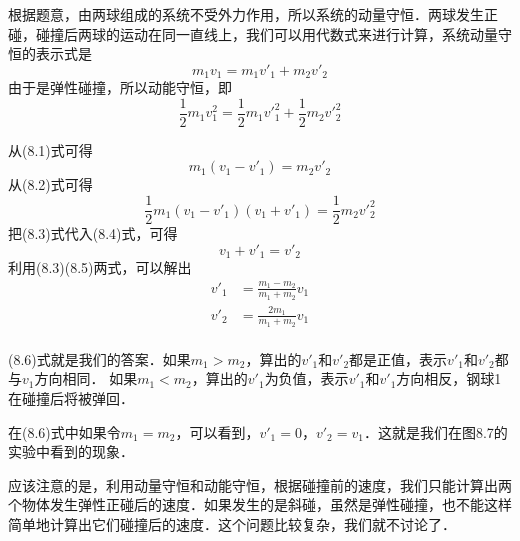 \begin{solution}
    根据题意，由两球组成的系统不受外力作用，所以系统的动量守恒．两球发生正碰，碰撞后两球的运动在同一直线上，我们可以用代数式来进行计算，系统动量守恒的表示式是
    \begin{equation}
        m_1v_1=m_1v'_1+m_2v'_2
    \end{equation}
    由于是弹性碰撞，所以动能守恒，即
    \begin{equation}
        \frac{1}{2}m_1v_1^2=\frac{1}{2}m_1{v'}_1^2+\frac{1}{2}m_2{v'}_2^2
    \end{equation}

    从(8.1)式可得
    \begin{equation}
        m_1(v_1-v'_1)=m_2v'_2
    \end{equation}
    从(8.2)式可得
    \begin{equation}
        \frac{1}{2}m_1(v_1-v'_1)(v_1+v'_1)=\frac{1}{2}m_2{v'}_2^2
    \end{equation}
    把(8.3)式代入(8.4)式，可得
    \begin{equation}
        v_1+v'_1=v'_2
    \end{equation}
    利用(8.3)(8.5)两式，可以解出
    \begin{equation}
        \begin{split}
            v'_1 & =\frac{m_1-m_2}{m_1+m_2}v_1 \\
            v'_2 & =\frac{2m_1}{m_1+m_2}v_1    \\
        \end{split}
    \end{equation}
\end{solution}

(8.6)式就是我们的答案．如果$m_1>m_2$，算出的$v'_1$和$v'_2$都是正值，表示$v'_1$和$v'_2$都与$v_1$方向相同．
如果$m_1<m_2$，算出的$v'_1$为负值，表示$v'_1$和$v'_1$方向相反，钢球1在碰撞后将被弹回．

在(8.6)式中如果令$m_1=m_2$，可以看到，$v'_1=0$，$v'_2=v_1$．这就是我们在图8.7的实验中看到的现象．

应该注意的是，利用动量守恒和动能守恒，根据碰撞前的速度，我们只能计算出两个物体发生弹性正碰后的速度．如果发生的是斜碰，虽然是弹性碰撞，也不能这样简单地计算出它们碰撞后的速度．这个问题比较复杂，我们就不讨论了．


